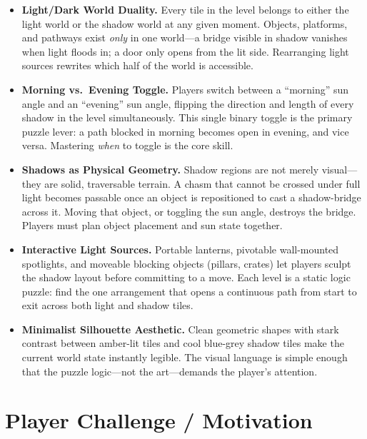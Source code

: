 \documentclass[11pt, letterpaper]{article}
\begin{document}
\begin{itemize}[leftmargin=1.5em, itemsep=3pt]

    \item \textbf{Light/Dark World Duality.} Every tile in the level belongs to either the light
    world or the shadow world at any given moment. Objects, platforms, and pathways exist
    \textit{only} in one world---a bridge visible in shadow vanishes when light floods in; a door
    only opens from the lit side. Rearranging light sources rewrites which half of the world is
    accessible.

    \item \textbf{Morning vs.\ Evening Toggle.} Players switch between a ``morning'' sun angle and
    an ``evening'' sun angle, flipping the direction and length of every shadow in the level
    simultaneously. This single binary toggle is the primary puzzle lever: a path blocked in
    morning becomes open in evening, and vice versa. Mastering \textit{when} to toggle is the
    core skill.

    \item \textbf{Shadows as Physical Geometry.} Shadow regions are not merely visual---they are
    solid, traversable terrain. A chasm that cannot be crossed under full light becomes passable
    once an object is repositioned to cast a shadow-bridge across it. Moving that object, or
    toggling the sun angle, destroys the bridge. Players must plan object placement and sun state
    together.

    \item \textbf{Interactive Light Sources.} Portable lanterns, pivotable wall-mounted spotlights,
    and moveable blocking objects (pillars, crates) let players sculpt the shadow layout before
    committing to a move. Each level is a static logic puzzle: find the one arrangement that opens
    a continuous path from start to exit across both light and shadow tiles.

    \item \textbf{Minimalist Silhouette Aesthetic.} Clean geometric shapes with stark contrast
    between amber-lit tiles and cool blue-grey shadow tiles make the current world state instantly
    legible. The visual language is simple enough that the puzzle logic---not the art---demands
    the player's attention.

\end{itemize}

\section*{Player Challenge / Motivation}
\end{document}
